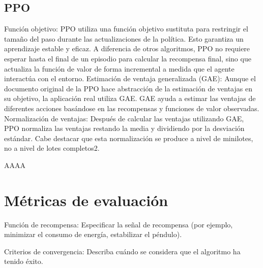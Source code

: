 \subsection{PPO}



Función objetivo:
PPO utiliza una función objetivo sustituta para restringir el tamaño del paso durante las actualizaciones de la política. Esto garantiza un aprendizaje estable y eficaz.
A diferencia de otros algoritmos, PPO no requiere esperar hasta el final de un episodio para calcular la recompensa final, sino que actualiza la función de valor de forma incremental a medida que el agente interactúa con el entorno.
Estimación de ventaja generalizada (GAE):
Aunque el documento original de la PPO hace abstracción de la estimación de ventajas en su objetivo, la aplicación real utiliza GAE.
GAE ayuda a estimar las ventajas de diferentes acciones basándose en las recompensas y funciones de valor observadas.
Normalización de ventajas:
Después de calcular las ventajas utilizando GAE, PPO normaliza las ventajas restando la media y dividiendo por la desviación estándar.
Cabe destacar que esta normalización se produce a nivel de minilotes, no a nivel de lotes completos2.


AAAA \cite{PPO2017}







\section{Métricas de evaluación}

Función de recompensa: Especificar la señal de recompensa (por ejemplo, minimizar el consumo de energía, estabilizar el péndulo).

Criterios de convergencia: Describa cuándo se considera que el algoritmo ha tenido éxito.
